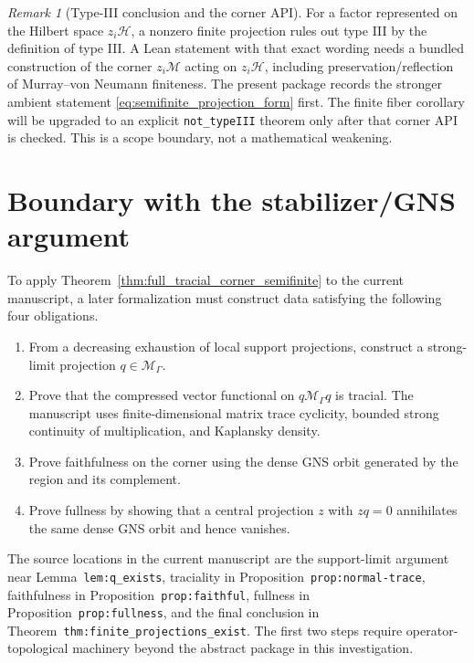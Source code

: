 \documentclass[11pt,reqno]{amsart}
\numberwithin{equation}{section}
\theoremstyle{definition}
\theoremstyle{remark}
\newtheorem{remark}[theorem]{Remark}
\newcommand{\cH}{\mathcal H}
\newcommand{\cM}{\mathcal M}
\begin{document}
\begin{remark}[Type-III conclusion and the corner API]
\label{rem:typeIII_corner_api}
For a factor represented on the Hilbert space $z_i\cH$, a nonzero finite
projection rules out type III by the definition of type III.  A Lean statement
with that exact wording needs a bundled construction of the corner
$z_i\cM$ acting on $z_i\cH$, including preservation/reflection of
Murray--von Neumann finiteness.  The present package records the stronger
ambient statement \eqref{eq:semifinite_projection_form} first.  The finite
fiber corollary will be upgraded to an explicit \texttt{not\_typeIII} theorem
only after that corner API is checked.  This is a scope boundary, not a
mathematical weakening.
\end{remark}

\section{Boundary with the stabilizer/GNS argument}
\label{sec:stabilizer_boundary}

To apply Theorem~\ref{thm:full_tracial_corner_semifinite} to the current
manuscript, a later formalization must construct data satisfying the following
four obligations.
\begin{enumerate}[label=\textup{(S\arabic*)},leftmargin=3em]
  \item From a decreasing exhaustion of local support projections, construct
  a strong-limit projection $q\in\cM_\Gamma$.
  \item Prove that the compressed vector functional on
  $q\cM_\Gamma q$ is tracial.  The manuscript uses finite-dimensional matrix
  trace cyclicity, bounded strong continuity of multiplication, and
  Kaplansky density.
  \item Prove faithfulness on the corner using the dense GNS orbit generated
  by the region and its complement.
  \item Prove fullness by showing that a central projection $z$ with $zq=0$
  annihilates the same dense GNS orbit and hence vanishes.
\end{enumerate}

The source locations in the current manuscript are the support-limit argument
near Lemma~\texttt{lem:q\_exists}, traciality in
Proposition~\texttt{prop:normal-trace}, faithfulness in
Proposition~\texttt{prop:faithful}, fullness in
Proposition~\texttt{prop:fullness}, and the final conclusion in
Theorem~\texttt{thm:finite\_projections\_exist}.  The first two steps require
operator-topological machinery beyond the abstract package in this
investigation.
\end{document}
